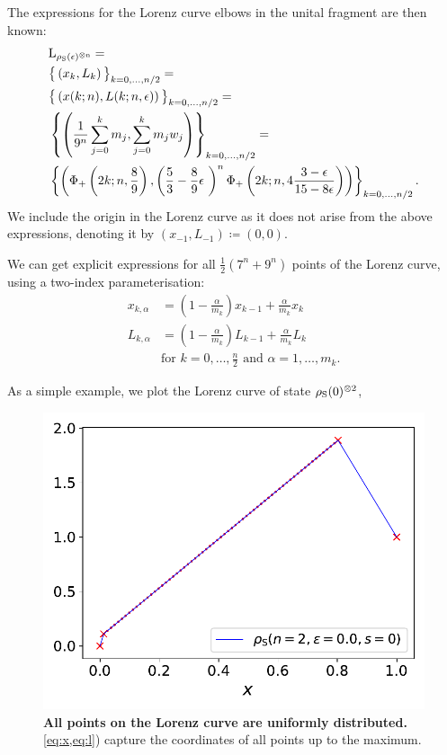 The expressions for the Lorenz curve elbows in the unital fragment are then known:
\begin{align}
    &{\rm{L}_{\rho_{\rm{S}}(\epsilon)^{\otimes n}}} = \\
    &\big\{\left( x_k, L_k \right)\big\}_{k=0,\dots,n/2} = \nonumber\\
    &\big\{\left( x(k; n), L(k; n, \epsilon) \right)\big\}_{k=0,\dots,n/2} = \nonumber\\
    &\left\{ \left( \frac{1}{9^n}\sum\limits_{j=0}^k m_j, \sum\limits_{j=0}^k m_j w_j \right) \right\}_{k=0,\dots,n/2} = \nonumber\\
    &\left\{ \left( \Phi_+\left(2k;n,\frac{8}{9}\right), \left( \frac{5}{3} - \frac{8}{9}\epsilon\ \right)^n \Phi_+\left(2k;n,4\frac{3-\epsilon}{15-8\epsilon}\right) \right) \right\}_{k=0,\dots,n/2}. \nonumber
\end{align}
We include the origin in the Lorenz curve as it does not arise from the above expressions, denoting it by $(x_{-1}, L_{-1}) \coloneqq (0,0)$.

We can get explicit expressions for all $\frac{1}{2}(7^n + 9^n)$ points of the Lorenz curve, using a two-index parameterisation:
\begin{align}
    x_{k,\alpha} &= \left( 1-\frac{\alpha}{m_k} \right) x_{k-1} + \frac{\alpha}{m_k} x_k \label{eq:x}\\
    L_{k,\alpha} &= \left( 1-\frac{\alpha}{m_k} \right) L_{k-1} + \frac{\alpha}{m_k} L_k \label{eq:l}\\
    &\text{for } k=0,\dots,\frac{n}{2} \text{ and } \alpha = 1,\dots,m_k. \nonumber
\end{align}

As a simple example, we plot the Lorenz curve of state $\rho_{\rm{S}}(0)^{\otimes 2}$,
\begin{figure}[h]
    \centering
    \includegraphics[scale=0.6]{figs/lcpoints.pdf}
    \caption{\textbf{All points on the Lorenz curve are uniformly distributed.}
    \cref{eq:x,eq:l}) capture the coordinates of all points up to the maximum.
    }
    \label{fig:lc}
\end{figure}

